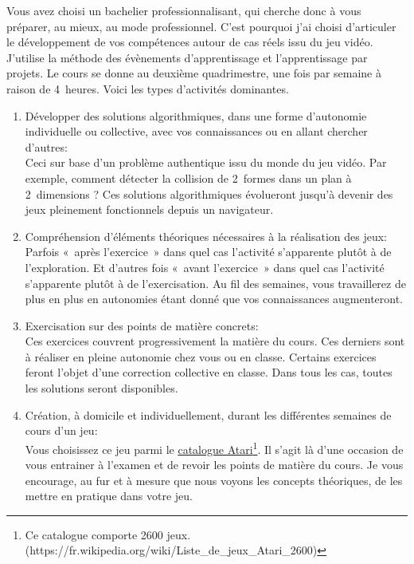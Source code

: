 Vous avez choisi un bachelier professionnalisant, qui cherche donc à vous préparer, au mieux, au mode professionnel. C’est  pourquoi j’ai choisi d’articuler le développement de vos compétences autour de cas réels issu du jeu vidéo. J'utilise la méthode des évènements d’apprentissage\cite{Leclercqevenements} et l'apprentissage par projets\cite{proulx2004apprentissage}.
Le cours se donne au deuxième quadrimestre, une fois par semaine à raison de 4~heures. Voici les types d'activités dominantes.
\begin{enumerate}
    \item Développer des solutions algorithmiques, dans une forme d’autonomie individuelle ou collective, avec vos connaissances ou en allant chercher d’autres:\\Ceci sur base d’un problème authentique issu du monde du jeu vidéo. Par exemple, comment détecter la collision de 2~formes dans un plan à 2~dimensions ? Ces solutions algorithmiques évolueront jusqu'à devenir des jeux pleinement fonctionnels depuis un navigateur.
    \item Compréhension d'éléments théoriques nécessaires à la réalisation des jeux:\\Parfois «~après l’exercice~» dans quel cas l’activité s’apparente plutôt à de l’exploration. Et d’autres fois «~avant l’exercice~» dans quel cas l’activité s’apparente plutôt à de l’exercisation. Au fil des semaines, vous travaillerez de plus en plus en autonomies étant donné que vos connaissances augmenteront.
    \item Exercisation sur des points de matière concrets:\\Ces exercices couvrent progressivement la matière du cours. Ces derniers sont à réaliser en pleine autonomie chez vous ou en classe. Certains exercices feront l'objet d'une correction collective en classe. Dans tous les cas, toutes les solutions seront disponibles.
    \item Création, à domicile et individuellement, durant les différentes semaines de cours d’un jeu:\\Vous choisissez ce jeu parmi le \href{https://fr.wikipedia.org/wiki/Liste_de_jeux_Atari_2600}{catalogue Atari}\footnote{Ce catalogue comporte 2600 jeux.(https://fr.wikipedia.org/wiki/Liste\_de\_jeux\_Atari\_2600)}. Il s’agit là d’une occasion de vous entrainer à l’examen et de revoir les points de matière du cours. Je vous encourage, au fur et à mesure que nous voyons les concepts théoriques, de les mettre en pratique dans votre jeu.
\end{enumerate}

